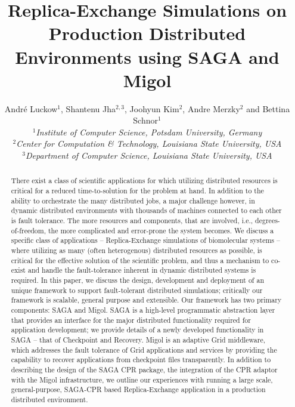 \documentclass[times, 10pt, twocolumn]{article}
\title{Replica-Exchange Simulations on Production Distributed
  Environments using SAGA and Migol}
\author{
  Andr\'e Luckow$^{1}$, Shantenu Jha$^{2,3}$, Joohyun Kim$^{2}$, Andre Merzky$^{2}$ and Bettina Schnor$^{1}$\\
  \small{\emph{$^{1}$Institute of Computer Science, Potsdam University, Germany}}\\
  \small{\emph{$^{2}$Center for Computation \& Technology, Louisiana State University, USA}}\\
  \small{\emph{$^{3}$Department of Computer Science, Louisiana State University, USA}}\\
}
\begin{document}
 


\maketitle    

\begin{abstract}
  There exist a class of scientific applications for which utilizing
  distributed resources is critical for a reduced time-to-solution for
  the problem at hand. In addition to the ability to orchestrate the
  many distributed jobs, a major challenge however, in dynamic
  distributed environments with thousands of machines connected to
  each other is fault tolerance. The more resources and components,
  that are involved, i.e., degrees-of-freedom, the more complicated
  and error-prone the system becomes.  We discuss a specific class of
  applications -- Replica-Exchange simulations of biomolecular systems
  -- where utilizing as many (often heterogenous) distributed
  resources as possible, is critical for the effective solution of the
  scientific problem, and thus a mechanism to co-exist and handle the
  fault-tolerance inherent in dynamic distributed systems is
  required. In this paper, we discuss the design, development and
  deployment of an unique framework to support fault-tolerant
  distributed simulations; critically our framework is scalable,
  general purpose and extensible. Our framework has two primary
  components: SAGA and Migol.  SAGA is a high-level programmatic
  abstraction layer that provides an interface for the major
  distributed functionality required for application development; we
  provide details of a newly developed functionality in SAGA -- that
  of Checkpoint and Recovery. Migol is an adaptive Grid middleware,
  which addresses the fault tolerance of Grid applications and
  services by providing the capability to recover applications from
  checkpoint files transparently.  In addition to describing the
  design of the SAGA CPR package, the integration of the CPR adaptor
  with the Migol infrastructure, we outline our experiences with
  running a large scale, general-purpose, SAGA-CPR based
  Replica-Exchange application in a production distributed
  environment.

    

\end{abstract}
\end{document}
